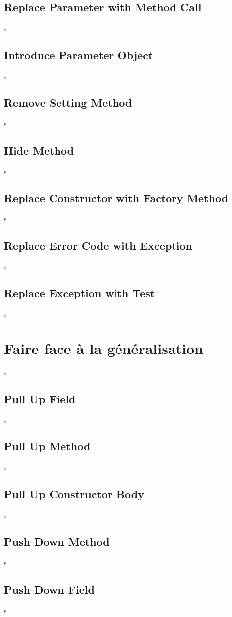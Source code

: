 \documentclass[a4paper,twoside,12pt,openright]{report}
\begin{document}
\subsection{Replace Parameter with Method Call}
s
\subsection{Introduce Parameter Object}
s
\subsection{Remove Setting Method}
s
\subsection{Hide Method}
s
\subsection{Replace Constructor with Factory Method}
s
\subsection{Replace Error Code with Exception}
s
\subsection{Replace Exception with Test}
s


\newpage
\section{Faire face à la généralisation}
s
\subsection{Pull Up Field}
s
\subsection{Pull Up Method}
s
\subsection{Pull Up Constructor Body}
s
\subsection{Push Down Method}
s
\subsection{Push Down Field}
s
\end{document}
